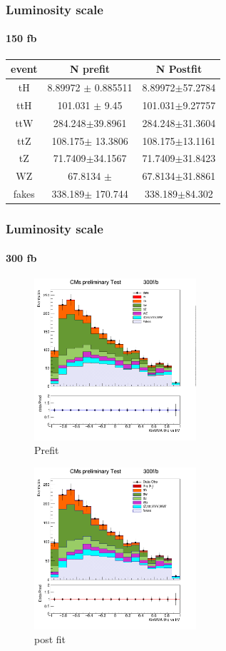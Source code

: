 \documentclass[11pt]{beamer}
\begin{document}
\begin{frame}
\frametitle{Luminosity scale}
\framesubtitle{150 fb}
\begin{table}
	\begin{tabular}{|c|c|c|}
		\hline
event  & N prefit    & N Postfit \\
\hline
tH & 8.89972 $\pm$  0.885511 & 8.89972$\pm$57.2784\\
\hline
ttH  & 101.031 $\pm$  9.45& 101.031$\pm$9.27757\\
\hline
ttW  & 284.248$\pm$39.8961  & 284.248$\pm$31.3604\\
\hline
ttZ  & 108.175$\pm$  13.3806 & 108.175$\pm$13.1161\\
\hline
tZ & 71.7409$\pm$34.1567  & 71.7409$\pm$31.8423\\
\hline
WZ & 67.8134 $\pm$ & 67.8134$\pm$31.8861\\
\hline
fakes  & 338.189$\pm$  170.744  & 338.189$\pm$84.302\\
\hline
	\end{tabular}
\end{table}
\end{frame}




\begin{frame}
\frametitle{Luminosity scale}
\framesubtitle{300 fb}
\begin{multicols}{2}
	\begin{center}
		\begin{figure}
			\includegraphics[width=6cm,height=6cm]{figures/300fb/kin-300.png}
				\caption*{Prefit }
		\end{figure}
	\end{center}
	\columnbreak
	\begin{center}
		\begin{figure}
			\includegraphics[width=6cm,height=6cm]{figures/300fb/simple.png}
				\caption*{post fit }
		\end{figure}
	\end{center}
\end{multicols}
\end{frame}
\end{document}

